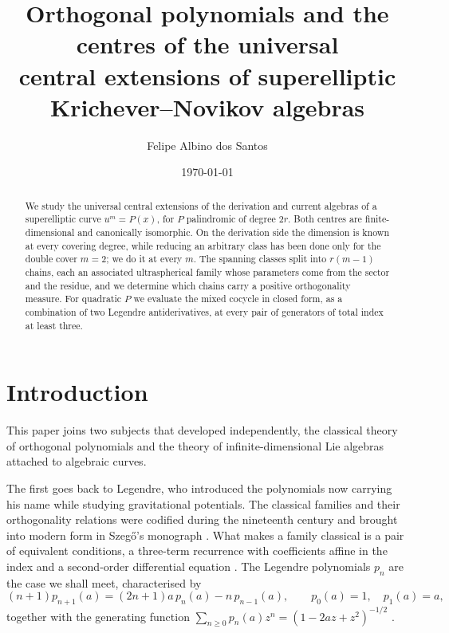 \documentclass[11pt]{amsart}
\title[Orthogonal polynomials and superelliptic UCE centres]
{Orthogonal polynomials and the centres of the universal\\
central extensions of superelliptic Krichever--Novikov algebras}
\author[Albino dos Santos]{Felipe Albino dos Santos}
\date{\today}
\theoremstyle{definition}
\theoremstyle{remark}
\begin{document}
\begin{abstract}
We study the universal central extensions of the derivation and current
algebras of a superelliptic curve $u^m=P(x)$, for $P$ palindromic of degree
$2r$. Both centres are finite-dimensional and canonically isomorphic. On the
derivation side the dimension is known at every covering degree, while reducing
an arbitrary class has been done only for the double cover $m=2$; we do it at
every $m$. The spanning classes split into $r(m-1)$ chains, each an associated
ultraspherical family whose parameters come from the sector and the residue,
and we determine which chains carry a positive orthogonality measure. For
quadratic $P$ we evaluate the mixed cocycle in closed form, as a combination of
two Legendre antiderivatives, at every pair of generators of total index at
least three.
\end{abstract}


\maketitle
\setcounter{tocdepth}{1}
\tableofcontents

\section{Introduction}
\label{sec:intro}

This paper joins two subjects that developed independently, the classical
theory of orthogonal polynomials and the theory of infinite-dimensional Lie
algebras attached to algebraic curves.

The first goes back to Legendre, who introduced the polynomials now carrying
his name while studying gravitational potentials. The classical families and
their orthogonality relations were codified during the nineteenth century and
brought into modern form in Szeg\H{o}'s monograph \cite{Szego1939}. What makes
a family classical is a pair of equivalent conditions, a three-term recurrence
with coefficients affine in the index and a second-order differential equation
\cite[\S 3.2]{Szego1939}. The Legendre polynomials $p_n$ are the case we shall
meet, characterised by
\[
  (n+1)p_{n+1}(a) = (2n+1)a\,p_n(a) - n\,p_{n-1}(a),
  \qquad p_0(a)=1,\quad p_1(a)=a,
\]
together with the generating function $\sum_{n\geq0}p_n(a)z^n=(1-2az+z^2)^{-1/2}$
\cite[(4.7.23)]{Szego1939}.
\end{document}
